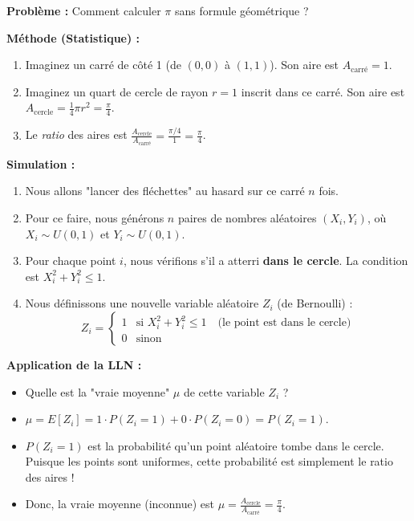 \begin{examplebox}

\textbf{Problème :} Comment calculer $\pi$ sans formule géométrique ?

\textbf{Méthode (Statistique) :}
\begin{enumerate}
    \item Imaginez un carré de côté 1 (de $(0,0)$ à $(1,1)$). Son aire est $A_{\text{carré}} = 1$.
    \item Imaginez un quart de cercle de rayon $r=1$ inscrit dans ce carré. Son aire est $A_{\text{cercle}} = \frac{1}{4}\pi r^2 = \frac{\pi}{4}$.
    \item Le \textit{ratio} des aires est $\frac{A_{\text{cercle}}}{A_{\text{carré}}} = \frac{\pi / 4}{1} = \frac{\pi}{4}$.
\end{enumerate}

\textbf{Simulation :}
\begin{enumerate}
    \item Nous allons "lancer des fléchettes" au hasard sur ce carré $n$ fois.
    \item Pour ce faire, nous générons $n$ paires de nombres aléatoires $(X_i, Y_i)$, où $X_i \sim U(0, 1)$ et $Y_i \sim U(0, 1)$.
    \item Pour chaque point $i$, nous vérifions s'il a atterri \textbf{dans le cercle}. La condition est $X_i^2 + Y_i^2 \le 1$.
    \item Nous définissons une nouvelle variable aléatoire $Z_i$ (de Bernoulli) :
$$ Z_i = \begin{cases} 1 & \text{si } X_i^2 + Y_i^2 \le 1 \quad \text{(le point est dans le cercle)} \\ 0 & \text{sinon} \end{cases} $$
\end{enumerate}

\textbf{Application de la LLN :}
\begin{itemize}
    \item Quelle est la "vraie moyenne" $\mu$ de cette variable $Z_i$ ?
    \item $\mu = E[Z_i] = 1 \cdot P(Z_i=1) + 0 \cdot P(Z_i=0) = P(Z_i=1)$.
    \item $P(Z_i=1)$ est la probabilité qu'un point aléatoire tombe dans le cercle. Puisque les points sont uniformes, cette probabilité est simplement le ratio des aires !
    \item Donc, la vraie moyenne (inconnue) est $\mu = \frac{A_{\text{cercle}}}{A_{\text{carré}}} = \frac{\pi}{4}$.
    

\end{itemize}
\end{examplebox}
